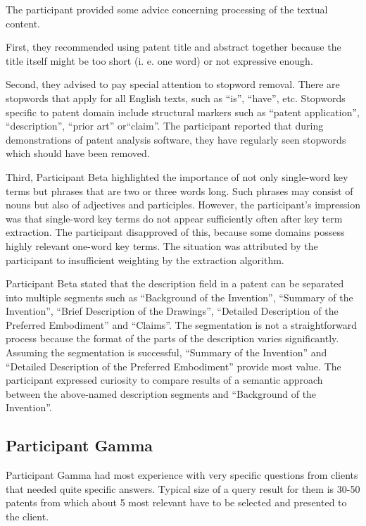 The participant provided some advice concerning processing of the textual content.

First, they recommended using patent title and abstract together because the title itself might be too short (i. e. one word) or not expressive enough.

Second, they advised to pay special attention to stopword removal. 
There are stopwords that apply for all English texts, such as ``is'', ``have'', etc. 
Stopwords specific to patent domain include structural markers such as ``patent application'', ``description'',  ``prior art'' or``claim''. 
The participant reported that during demonstrations of patent analysis software, they have regularly seen stopwords which should have been removed.

Third, Participant Beta highlighted the importance of not only single-word key terms but phrases that are two or three words long.
Such phrases may consist of nouns but also of adjectives and participles.
However, the participant's impression was that single-word key terms do not appear sufficiently often after key term extraction.
The participant disapproved of this, because some domains possess highly relevant one-word key terms. 
The situation was attributed by the participant to insufficient weighting by the extraction algorithm.

Participant Beta stated that the description field in a patent can be separated into multiple segments such as ``Background of the Invention'', ``Summary of the Invention'', ``Brief Description of the Drawings'', ``Detailed Description of the Preferred Embodiment'' and ``Claims''.
The segmentation is not a straightforward process because the format of the parts of the description varies significantly.
Assuming the segmentation is successful, ``Summary of the Invention'' and ``Detailed Description of the Preferred Embodiment'' provide most value.
The participant expressed curiosity to compare results of a semantic approach between the above-named description segments and ``Background of the Invention''.

\subsection{Participant Gamma}
\label{subsec:participant_gamma}

Participant Gamma had most experience with very specific questions from clients that needed quite specific answers. Typical size of a query result for them is 30-50 patents from which about 5 most relevant have to be selected and presented to the client.

